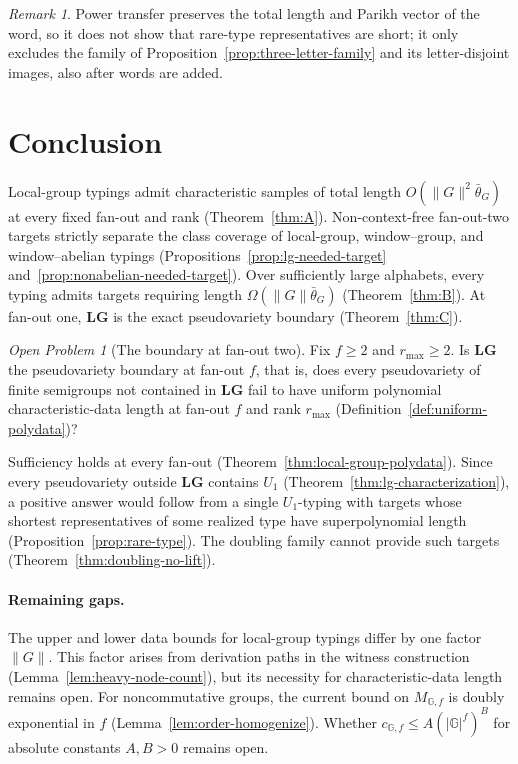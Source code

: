\documentclass[11pt]{article}
\numberwithin{equation}{section}
\theoremstyle{plain}
\theoremstyle{definition}
\theoremstyle{remark}
\newtheorem{remark}[theorem]{Remark}
\newtheorem{openproblem}[theorem]{Open Problem}
\theoremstyle{plain}
\begin{document}
\begin{remark}
Power transfer preserves the total length and Parikh vector of the word, so it
does not show that rare-type representatives are short; it only excludes the
family of Proposition~\ref{prop:three-letter-family} and its letter-disjoint images,
also after words are added.
\end{remark}

\section{Conclusion}
\label{sec:conclusion}

Local-group typings admit characteristic samples of total length
$O(\|G\|^2\bar\theta_G)$ at every fixed fan-out and rank
(Theorem~\ref{thm:A}). Non-context-free fan-out-two targets
strictly separate the class coverage of local-group,
window--group, and window--abelian typings
(Propositions~\ref{prop:lg-needed-target}
and~\ref{prop:nonabelian-needed-target}).
Over sufficiently large alphabets, every typing admits
targets requiring length $\Omega(\|G\|\bar\theta_G)$
(Theorem~\ref{thm:B}). At fan-out one, $\mathbf{LG}$ is
the exact pseudovariety boundary (Theorem~\ref{thm:C}).

\begin{openproblem}[The boundary at fan-out two]
\label{op:fanout-two}
Fix $f\ge2$ and $r_{\max}\ge2$.  Is $\mathbf{LG}$ the pseudovariety boundary at
fan-out $f$, that is, does every pseudovariety of finite semigroups not
contained in $\mathbf{LG}$ fail to have uniform polynomial characteristic-data
length at fan-out $f$ and rank $r_{\max}$
(Definition~\ref{def:uniform-polydata})?
\end{openproblem}

Sufficiency holds at every fan-out
(Theorem~\ref{thm:local-group-polydata}).
Since every pseudovariety outside $\mathbf{LG}$
contains $U_1$ (Theorem~\ref{thm:lg-characterization}),
a positive answer would follow from a single
$U_1$-typing with targets whose shortest representatives
of some realized type have superpolynomial length
(Proposition~\ref{prop:rare-type}).
The doubling family cannot provide such targets
(Theorem~\ref{thm:doubling-no-lift}).

\paragraph{Remaining gaps.}
The upper and lower data bounds for local-group
typings differ by one factor $\|G\|$. This factor
arises from derivation paths in the witness construction
(Lemma~\ref{lem:heavy-node-count}), but its necessity
for characteristic-data length remains open.
For noncommutative groups, the current bound on
$M_{\mathbb G,f}$ is doubly exponential in $f$
(Lemma~\ref{lem:order-homogenize}).
Whether $c_{\mathbb G,f}\le A(|\mathbb G|^f)^B$
for absolute constants $A,B>0$ remains open.
\end{document}
